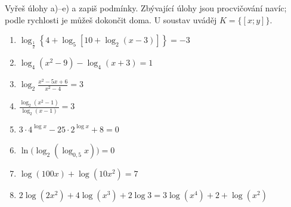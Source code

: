 \documentclass[11pt,a4paper]{article}
\begin{document}
Vyřeš úlohy a)--e) a zapiš podmínky. Zbývající úlohy jsou procvičování navíc; podle rychlosti je můžeš dokončit doma. U soustav uváděj $K=\{[x;y]\}$. 
\begin{zadaniBox}[title={Domácí úkol}]
\begin{enumerate}[label=\alph*)]
\item $\displaystyle \log_{\frac12}\left\{4+\log_5\left[10+\log_2(x-3)\right]\right\}=-3$
\item $\displaystyle \log_4(x^2-9)-\log_4(x+3)=1$
\item $\displaystyle \log_2\frac{x^2-5x+6}{x^2-4}=3$
\item $\displaystyle \frac{\log_2(x^2-1)}{\log_2(x-1)}=3$
\item $\displaystyle 3\cdot4^{\log x}-25\cdot2^{\log x}+8=0$
\item $\displaystyle \ln\bigl(\log_2(\log_{0{,}5}x)\bigr)=0$
\item $\displaystyle \log(100x)+\log(10x^2)=7$
\item $\displaystyle 2\log(2x^2)+4\log(x^3)+2\log 3=3\log(x^4)+2+\log(x^2)$
\end{enumerate}
\end{zadaniBox}
\end{document}
